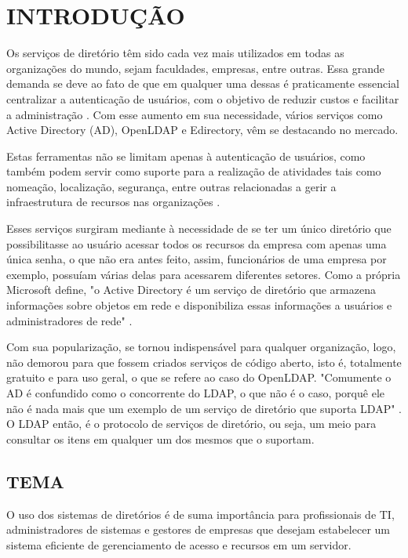 \newpage

\section{INTRODUÇÃO}
\label{sec:introdução}
Os serviços de diretório têm sido cada vez mais utilizados em todas as
organizações do mundo, sejam faculdades, empresas, entre outras. Essa
grande demanda se deve ao fato de que em qualquer uma dessas é praticamente essencial centralizar a autenticação de usuários, com o objetivo de reduzir custos e facilitar a administração \cite{berbelini}. Com esse aumento em sua necessidade, vários serviços como Active Directory (AD), OpenLDAP e Edirectory, vêm se destacando no mercado.

Estas ferramentas não se limitam apenas à autenticação de usuários, como também podem servir como suporte para a realização de atividades tais como nomeação, localização, segurança, entre outras relacionadas a gerir a infraestrutura de recursos nas organizações \cite{cruz2023}.

Esses serviços surgiram mediante à necessidade de se ter um único diretório que possibilitasse ao usuário acessar todos os recursos da empresa com apenas uma única senha, o que não era antes feito, assim, funcionários de uma empresa por exemplo, possuíam várias delas para acessarem diferentes setores. Como a própria Microsoft define, "o  Active  Directory é  um  serviço  de  diretório  que  armazena  informações sobre objetos em rede e disponibiliza essas informações a usuários e administradores de rede" \cite{microsoftlearn}.

Com sua popularização, se tornou indispensável para qualquer organização, logo,  não demorou para que fossem criados serviços de código aberto, isto é, totalmente gratuito e para uso geral, o que se refere ao caso do OpenLDAP. "Comumente o AD é confundido como o concorrente do LDAP, o que não é o caso, porquê ele não é nada mais que um exemplo de um serviço de diretório que suporta LDAP" \cite{bertolli}. O LDAP então, é o protocolo de serviços de diretório, ou seja, um meio para consultar os itens em qualquer um dos mesmos que o suportam.


\subsection{TEMA}
\label{subsec:tema}
O uso dos sistemas de diretórios é de suma importância para profissionais de TI, administradores de sistemas e gestores de empresas que desejam estabelecer um sistema eficiente de gerenciamento de acesso e recursos em um servidor.

